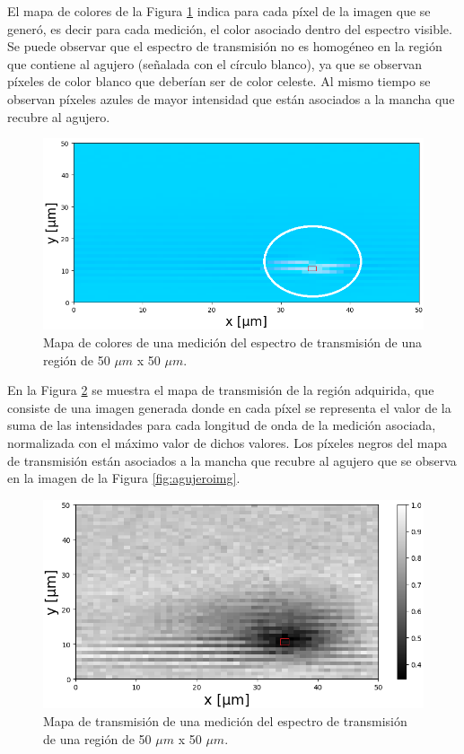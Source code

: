 El mapa de colores de la Figura \ref{fig:mapargbag} indica para cada píxel de la imagen que se generó, es decir para cada medición, el color asociado dentro del espectro visible. Se puede observar que el espectro de transmisión no es homogéneo en la región que contiene al agujero (señalada con el círculo blanco), ya que se observan píxeles de color blanco que deberían ser de color celeste. Al mismo tiempo se observan píxeles azules de mayor intensidad que están asociados a la mancha que recubre al agujero. 

 \begin{figure}[H]
	\centering
	\includegraphics[width=1.0\textwidth]{Figs/microespectrometro/imshow_rgbagujero.png}
	\caption{Mapa de colores de una medición del espectro de transmisión de una región de 50 $\mu m$ x 50 $\mu m$.}
	\label{fig:mapargbag}
\end{figure}


En la Figura \ref{fig:mapatransmag} se muestra el mapa de transmisión de la región adquirida, que consiste de una imagen generada donde en cada píxel se representa el valor de la suma de las intensidades para cada longitud de onda de la medición asociada, normalizada con el máximo valor de dichos valores. Los píxeles negros del mapa de transmisión están asociados a la mancha que recubre al agujero que se observa en la imagen de la Figura \ref{fig:agujeroimg}.
 \begin{figure}[H]
	\centering
	\includegraphics[width=1.0\textwidth]{Figs/microespectrometro/mapatransmagujero.png}
	\caption{Mapa de transmisión de una medición del espectro de transmisión de una región de 50 $\mu m$ x 50 $\mu m$. }
	\label{fig:mapatransmag}
\end{figure}

